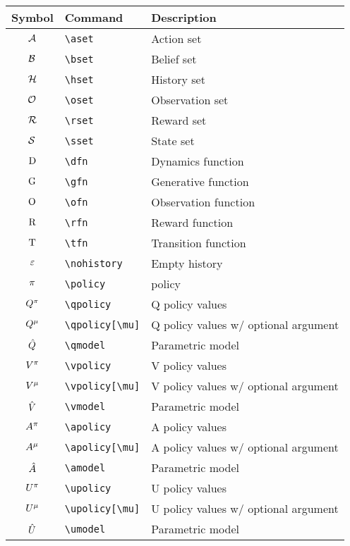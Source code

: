 \documentclass{article}
\begin{document}
\begin{tabular}{cll}
  \toprule
  Symbol & Command & Description \\
  \midrule
  $\aset$ & \verb|\aset| & Action set \\
  $\bset$ & \verb|\bset| & Belief set \\
  $\hset$ & \verb|\hset| & History set \\
  $\oset$ & \verb|\oset| & Observation set \\
  $\rset$ & \verb|\rset| & Reward set \\
  $\sset$ & \verb|\sset| & State set \\
  \midrule
  $\dfn$ & \verb|\dfn| & Dynamics function \\
  $\gfn$ & \verb|\gfn| & Generative function \\
  $\ofn$ & \verb|\ofn| & Observation function \\
  $\rfn$ & \verb|\rfn| & Reward function \\
  $\tfn$ & \verb|\tfn| & Transition function \\
  \midrule
  $\nohistory$ & \verb|\nohistory| & Empty history \\
  \midrule
  $\policy$ & \verb|\policy| & policy \\
  \midrule
  $\qpolicy$ & \verb|\qpolicy| & Q policy values \\
  $\qpolicy[\mu]$ & \verb|\qpolicy[\mu]| & Q policy values w/ optional argument \\
  $\qmodel$ & \verb|\qmodel| & Parametric model \\
  \midrule
  $\vpolicy$ & \verb|\vpolicy| & V policy values \\
  $\vpolicy[\mu]$ & \verb|\vpolicy[\mu]| & V policy values w/ optional argument \\
  $\vmodel$ & \verb|\vmodel| & Parametric model \\
  \midrule
  $\apolicy$ & \verb|\apolicy| & A policy values \\
  $\apolicy[\mu]$ & \verb|\apolicy[\mu]| & A policy values w/ optional argument \\
  $\amodel$ & \verb|\amodel| & Parametric model \\
  \midrule
  $\upolicy$ & \verb|\upolicy| & U policy values \\
  $\upolicy[\mu]$ & \verb|\upolicy[\mu]| & U policy values w/ optional argument \\
  $\umodel$ & \verb|\umodel| & Parametric model \\
  \bottomrule
\end{tabular}
\end{document}
